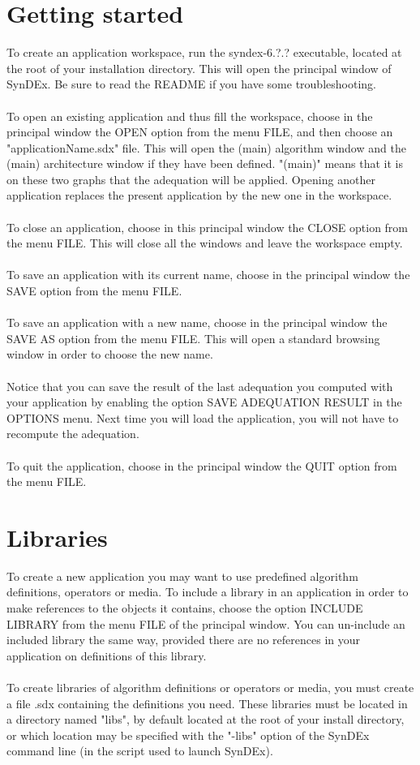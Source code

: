 \documentclass[11pt,twoside]{report}
\begin{document}
\chapter{Getting started}
To create an application workspace, run the syndex-6.?.? executable,
located at the root of your installation directory. This will open the
principal window of SynDEx. Be sure to read the README if you have
some troubleshooting.\\\\
To open an existing application and thus fill the workspace, choose in
the principal window the OPEN option from the menu FILE, and then
choose an "applicationName.sdx" file. This will open the (main)
algorithm window and the (main) architecture window if they have been
defined. "(main)" means that it is on these two graphs that the
adequation will be
applied. Opening another application replaces the present application by the new one in the workspace.\\\\
To close an application, choose in this principal window the CLOSE
option from the menu FILE. This will close all the windows and leave the workspace empty.\\\\
To save an application with its current name, choose in the principal window the SAVE option from the menu FILE.\\\\
To save an application with a new name, choose in the principal window
the SAVE AS option from the menu FILE. This will open a standard
browsing window in order to choose the new name.\\\\
Notice that you can save the result of the last adequation you
computed with your application by enabling the option SAVE ADEQUATION
RESULT in the OPTIONS menu. Next time you will load the application,
you will not have to recompute the adequation.\\\\
To quit the application, choose in the principal window the QUIT
option from the menu FILE.

\chapter{Libraries}
To create a new application you may want to use predefined algorithm
definitions, operators or media. To include a library in an
application in order to make references to the objects it contains,
choose the option INCLUDE LIBRARY from the menu FILE of the principal
window. You can un-include an included library the same way, provided
there are no references in your application on definitions of this library.\\\\
To create libraries of algorithm definitions or operators or media,
you must create a file .sdx containing the definitions you need. These
libraries must be located in a directory named "libs", by default
located at the root of your install directory, or which
location may be specified with the "-libs" option of the SynDEx command line (in the script used to launch SynDEx).\\\\
\end{document}
